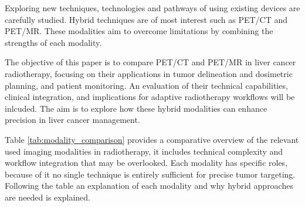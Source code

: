 \documentclass[11pt]{article} %
\begin{document}
\begin{multicols}{2}
Exploring new techniques, technologies and pathways of using existing devices are carefully studied. Hybrid techniques are of most interest such as PET/CT and PET/MR. These modalities aim to overcome limitations by combining the strengths of each modality.

The objective of this paper is to compare PET/CT and PET/MR in liver cancer radiotherapy, focusing on their applications in tumor delineation and dosimetric planning, and patient monitoring. An evaluation of their technical capabilities, clinical integration, and implications for adaptive radiotherapy workflows will be inlcuded. The aim is to explore how these hybrid modalities can enhance precision in liver cancer management. 

Table \ref{tab:modality_comparison} provides a comparative overview of the relevant used imaging modalities in radiotherapy, it includes technical complexity and workflow integration that may be overlooked. Each modality has specific roles, because of it no single technique is entirely sufficient for precise tumor targeting. Following the table an explanation of each modality and why hybrid approaches are needed is explained.

\end{multicols}
\end{document}

